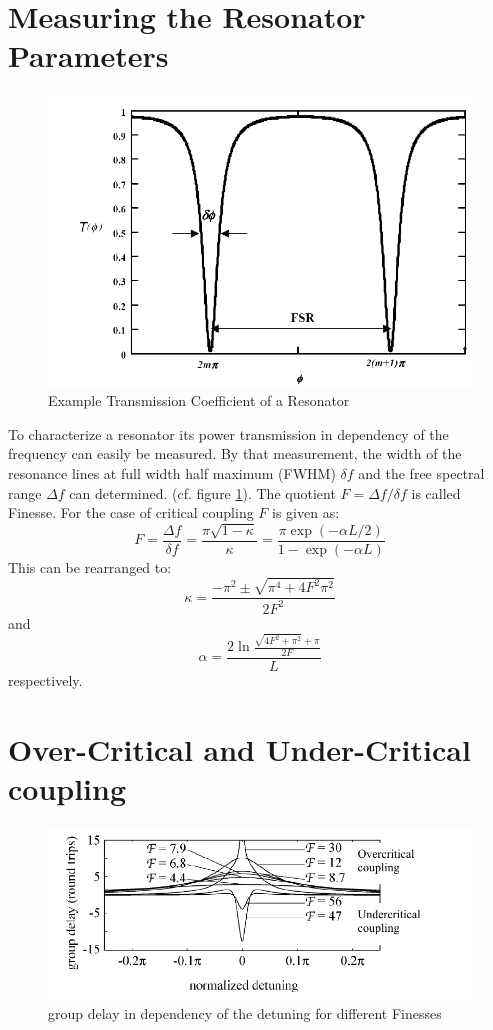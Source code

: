 \section{Measuring the Resonator Parameters}

\begin{figure}[h]%
\centering
\includegraphics[width=.5\columnwidth]{Grafiken/S21.pdf}%
\caption{Example Transmission Coefficient of a Resonator}%
\label{fig:S21}%
\end{figure}

To characterize a resonator its power transmission in dependency of the frequency can easily be measured. By that measurement, the width of the resonance lines at full width half maximum (FWHM) $\delta f$ and the free spectral range $\Delta f$ can determined. (cf. figure \ref{fig:S21}). The quotient $F= \Delta f/\delta f$ is called Finesse. For the case of critical coupling $F$ is given as:
\begin{equation}
 F = \frac{\Delta f}{\delta f} = \frac{\pi\sqrt{1-\kappa}}{\kappa}=\frac{\pi\exp\left(-\alpha L/2\right)}{1-\exp\left(-\alpha L\right)}
\end{equation}
This can be rearranged to:
\begin{equation}
 \kappa = \frac{-\pi^2 \pm \sqrt{\pi^4+4F^2\pi^2}}{2F^2}
 \label{eq:kappa}
\end{equation}
and
\begin{equation}
\alpha = \frac{2\ln\frac{\sqrt{4F^2+\pi^2}+\pi}{2F}}{L} 
\label{eq:alpha}
\end{equation}
respectively.

\section{Over-Critical and Under-Critical coupling}
\begin{figure}[h]%
\centering
\includegraphics[width=.7\columnwidth]{Grafiken/crit_coupling.pdf}%
\caption{group delay in dependency of the detuning for different Finesses}%
\label{fig:crit_coupling}%
\end{figure}

